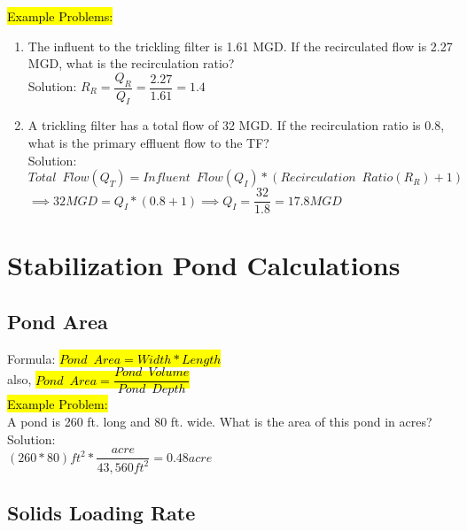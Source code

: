 \hl{Example Problems:}\\
\begin{enumerate}
\item The influent to the trickling filter is 1.61 MGD. If the recirculated flow is 2.27 MGD, what is the recirculation ratio?\\
\vspace{0.2cm}
Solution:  $R_R=\dfrac{Q_R}{Q_I}=\dfrac{2.27}{1.61}=\boxed{1.4}$\\
\vspace{0.2cm}
\item A trickling filter has a total flow of 32 MGD.  If the recirculation ratio is 0.8, what is the primary effluent flow to the TF?\\
\vspace{0.2cm}
Solution:\\
\vspace{0.2cm}
$Total \enspace Flow (Q_T) = Influent \enspace Flow (Q_I)*(Recirculation \enspace Ratio(R_R) +1)$\\
$\implies 32 MGD=Q_I*(0.8+1)\implies Q_I=\dfrac{32}{1.8}=\boxed{17.8 MGD}$
\end{enumerate}




\section{Stabilization Pond Calculations} 
\subsection{Pond Area}

Formula: \hl{$Pond \enspace Area=Width * Length$}\\
\vspace{0.2cm}
also,     \hl{$Pond \enspace Area=\dfrac{Pond \enspace Volume}{Pond \enspace Depth}$}\\
\vspace{0.2cm}
\hl{Example Problem:}\\
A pond is 260 ft. long and 80 ft. wide. What is the area of this pond in acres?\\ 
\vspace{0.2cm}
Solution:\\
\vspace{0.2cm}
$(260*80)ft^2*\dfrac{acre}{43,560ft^2}=\boxed{0.48acre}$

\subsection{Solids Loading Rate}


